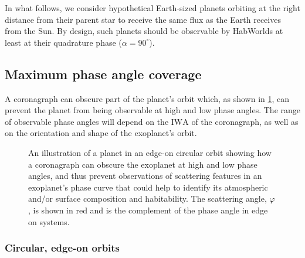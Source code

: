 \documentclass[
    usenatbib,
]{mnras}
\newcommand{\IWA}{\ensuremath{\mathrm{IWA}}}
\newcommand{\hwo}{HabWorlds}
\begin{document}
In what follows, we consider hypothetical Earth-sized planets orbiting at the right distance from their parent star to receive the same flux as the Earth receives from the Sun.
%
By design, such planets should be observable by \hwo{} at least at their quadrature phase ($\alpha=90^\circ$).


\subsection{Maximum phase angle coverage}
\label{subsec:2.2}

A coronagraph can obscure part of the planet's orbit which, as shown in \cref{fig:annotated-orbit}, can prevent the planet from being observable at high and low phase angles. 
%
The range of observable phase angles will depend on the \IWA{} of the coronagraph, as well as on the orientation and shape of the exoplanet's orbit.

\begin{figure}
    \centering
    
    \caption{
        An illustration of a planet in an edge-on circular orbit showing how a coronagraph can obscure the exoplanet at high and low phase angles, and thus prevent observations of scattering features in an exoplanet's phase curve that could help to identify its atmospheric and/or surface composition and habitability. 
        The scattering angle, $\varphi$, is shown in red and is the complement of the phase angle in edge on systems.
    }
    \label{fig:annotated-orbit}
\end{figure}

\subsubsection{Circular, edge-on orbits}
\end{document}
